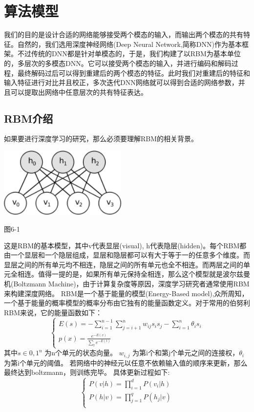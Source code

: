 \section{算法模型}
	我们的目的是设计合适的网络能够接受两个模态的输入，而输出两个模态的共有特征。自然的，我们选用深度神经网络(Deep Neural Network,简称DNN)作为基本框架。不过传统的DNN都是针对单模态的，于是，我们构建了以RBM为基本单位的，多层次的多模态DNN。它可以接受两个模态的输入，并进行编码和解码过程，最终解码过后可以得到重建后的两个模态的特征。此时我们对重建后的特征和输入特征进行对比并且校正，多次迭代DNN网络就可以得到合适的网络参数，并且可以提取出网络中任意层次的共有特征表达。
	\subsection{RBM介绍}
	如果要进行深度学习的研究，那么必须要理解RBM的相关背景。\\
	\par
	\centerline{\includegraphics[width=2.5in]{figure/rbm.png}} %
	\centerline{图6-1}

	这是RBM的基本模型，其中v代表显层(visual), h代表隐层(hidden)。每个RBM都由一个显层和一个隐层组成，显层和隐层都可以有大于等于一的任意多个维度。而显层之间的所有单元均不相连，隐层之间的所有单元也全不相连。而两层之间的单元全相连。值得一提的是，如果所有单元保持全相连，那么这个模型就是波尔兹曼机(Boltzmann Machine)，由于计算复杂度等原因，深度学习研究者通常使用RBM来构建深度网络。
	RBM是一个基于能量的模型(Energy-Based model),众所周知，一个基于能量的概率模型的概率分布由它独有的能量函数定义。对于常用的伯努利RBM来说，它的能量函数如下：
	\begin{equation}
	\begin{cases}
	E(s) = -\sum\limits_{i=1}^{n-1}\sum\limits_{j = i + 1}^{n} w_{ij}s_is_j - \sum\limits_{i=1}^n \theta_i s_i \\
	p(x) = \frac{e^{-E(x)}}{\sum\limits_t e^{-E(t)}}
	\end{cases}
	\end{equation}
	其中$s \in {0, 1}^n$  为n个单元的状态向量。 $w_{i, j}$ 为第i个和第j个单元之间的连接权，$\theta_i$为第i个单元的阈值。
	若网络中的神经元以任意不依赖输入值的顺序来更新，那么最终达到boltzmann，则训练完毕。
	具体更新过程如下:
	\begin{equation}
	\begin{cases}
	P(v|h) = \prod\limits_{i=1}^d P(v_i |h)\\
	P(h|v) = \prod\limits_{j=1}^q P(h_j |v)\\
	\end{cases}
	\end{equation}
	
